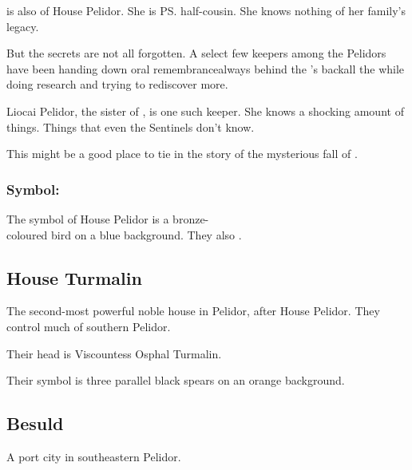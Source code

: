 \Tiroco{} is also of House Pelidor. She is \ps{\Icor} half-cousin. She knows nothing of her family's legacy. 

But the secrets are not all forgotten. A select few keepers among the Pelidors have been handing down oral remembrance\dash always behind the \rayuth's back\dash all the while doing research and trying to rediscover more. 

Liocai Pelidor, the sister of \rayuth[\Icor], is one such keeper. She knows a shocking amount of things. Things that even the Sentinels don't know. 
 
This might be a good place to tie in the story of the mysterious fall of . 









\subsubsection{Symbol: \Grulcan}
The symbol of House Pelidor is a bronze-\\coloured {} bird on a blue background. They also . 









\subsection{House Turmalin}
The second-most powerful noble house in Pelidor, after House Pelidor. 
They control much of southern Pelidor. 

Their head is Viscountess Osphal Turmalin. 

Their symbol is three parallel black spears on an orange background. 









\subsection{Besuld}
A port city in southeastern Pelidor. 











